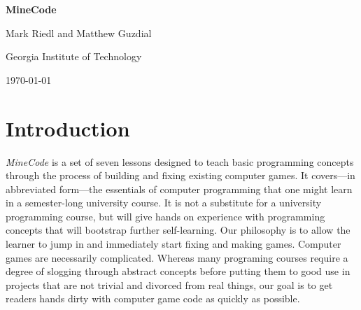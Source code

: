 \documentclass{article}
\begin{document}
\vspace*{\fill}
\begin{center}
{\Huge\bf MineCode}

\vspace{2\baselineskip}

{\Large Mark Riedl and Matthew Guzdial}

\vspace{1\baselineskip}

{\large Georgia Institute of Technology}

\vspace{1\baselineskip}

{\large \today}

\end{center}
\vspace*{\fill}
\newpage


\section{Introduction}


{\em MineCode} is a set of seven lessons designed to teach basic programming concepts through the process of building and fixing existing computer games.
It covers---in abbreviated form---the essentials of computer programming that one might learn in a semester-long university course. 
It is not a substitute for a university programming course, but will give hands on experience with programming concepts that will bootstrap further self-learning. 
%
Our philosophy is to allow the learner to jump in and immediately start fixing and making games. 
Computer games are necessarily complicated.
Whereas many programing courses require a degree of slogging through abstract concepts before putting them to good use in projects that are not trivial and divorced from real things, our goal is to get readers hands dirty with computer game code as quickly as possible.
\end{document}
